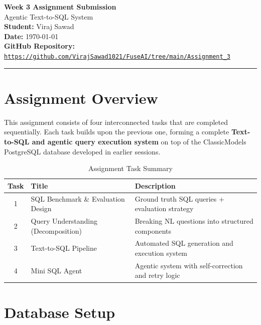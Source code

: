 \documentclass[12pt, a4paper]{article}
\begin{document}
\begin{center}
    {\LARGE \textbf{Week 3 Assignment Submission}} \\[0.4em]
    {\large Agentic Text-to-SQL System} \\[0.6em]
    \textbf{Student:} Viraj Sawad \\[0.3em]
    \textbf{Date:} \today \\[0.6em]
    \textbf{GitHub Repository:} \\
    \href{https://github.com/VirajSawad1021/FuseAI/tree/main/Assignment_3}{%
        \texttt{https://github.com/VirajSawad1021/FuseAI/tree/main/Assignment\_3}}
\end{center}

\vspace{1em}
\hrule
\vspace{1.5em}

\section{Assignment Overview}

This assignment consists of four interconnected tasks that are completed sequentially. Each task builds upon the previous one, forming a complete \textbf{Text-to-SQL and agentic query execution system} on top of the ClassicModels PostgreSQL database developed in earlier sessions.

\begin{table}[h!]
\centering
\begin{tabular}{@{}cll@{}}
\toprule
\textbf{Task} & \textbf{Title} & \textbf{Description} \\
\midrule
1 & SQL Benchmark \& Evaluation Design     & Ground truth SQL queries + evaluation strategy \\
2 & Query Understanding (Decomposition)    & Breaking NL questions into structured components \\
3 & Text-to-SQL Pipeline                   & Automated SQL generation and execution system \\
4 & Mini SQL Agent                         & Agentic system with self-correction and retry logic \\
\bottomrule
\end{tabular}
\caption{Assignment Task Summary}
\end{table}

\section{Database Setup}
\end{document}
